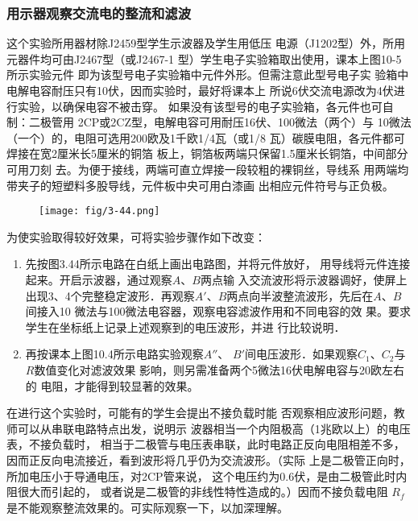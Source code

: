 \subsubsection{用示器观察交流电的整流和滤波}
这个实验所用器材除J2459型学生示波器及学生用低压
电源（J1202型）外，所用元器件均可由J2467型（或J2467-1
型）学生电子实验箱取出使用，课本上图10-5所示实验元件
即为该型号电子实验箱中元件外形。但需注意此型号电子实
验箱中电解电容耐压只有10伏，因而实验时，最好将课本上
所说6伏交流电源改为4伏进行实验，以确保电容不被击穿。
如果没有该型号的电子实验箱，各元件也可自制：二极管用
2CP或2CZ型，电解电容可用耐压16伏、100微法（两个）与
10微法（一个）的，电阻可选用200欧及1千欧1/4瓦（或1/8
瓦）碳膜电阻，各元件都可焊接在宽2厘米长5厘米的铜箔
板上，铜箔板两端只保留1.5厘米长铜箔，中间部分可用刀刻
去。为便于接线，两端可直立焊接一段较粗的裸铜丝，导线系
用两端均带夹子的短塑料多股导线，元件板中央可用白漆画
出相应元件符号与正负极。

\begin{figure}[htp]
    \centering
\texttt{[image: fig/3-44.png]}
    \caption{}
\end{figure}

为使实验取得较好效果，可将实验步骤作如下改变：
\begin{enumerate}
    \item 先按图3.44所示电路在白纸上画出电路图，并将元件放好，
用导线将元件连接起来。开启示波器，通过观察$A$、$B$两点输
入交流波形将示波器调好，使屏上出现3、4个完整稳定波形．再观察$A'$、$B$两点向半波整流波形，先后在$A$、$B$间接入10
微法与100微法电容器，观察电容滤波作用和不同电容的效
果。要求学生在坐标纸上记录上述观察到的电压波形，并进
行比较说明．
\item 再按课本上图10.4所示电路实验观察$A''$、
$B'$间电压波形．如果观察$C_1$、$C_2$与$R$数值变化对滤波效果
影响，则另需准备两个5微法16伏电解电容与20欧左右的
电阻，才能得到较显著的效果。
\end{enumerate}

在进行这个实验时，可能有的学生会提出不接负载时能
否观察相应波形问题，教师可以从串联电路特点出发，说明示
波器相当一个内阻极高（1兆欧以上）的电压表，不接负载时，
相当于二极管与电压表串联，此时电路正反向电阻相差不多，
因而正反向电流接近，看到波形将几乎仍为交流波形。（实际
上是二极管正向时，所加电压小于导通电压，对2CP管来说，
这个电压约为0.6伏，是由二极管此时内阻很大而引起的，
或者说是二极管的非线性特性造成的。）因而不接负载电阻
$R_f$是不能观察整流效果的。可实际观察一下，以加深理解。


